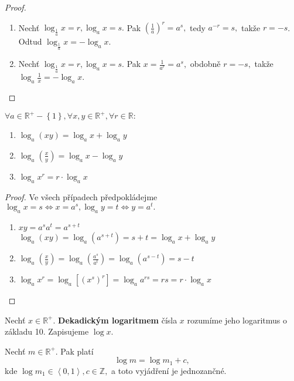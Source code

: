 \begin{proof}
    \begin{enumerate}[$i.$]
        \item Nechť $\log_{\frac{1}{a}} x = r, \log_a x = s.$ Pak
        $\left ( \frac{1}{a} \right )^r = a^s,$ tedy $a^{-r}=s,$ takže $r=-s$.
        Odtud $\log_{\frac{1}{a}} x = -\log_a x.$
       	\item Nechť $\log_{\frac{1}{a}} x = r, \log_a x = s.$ Pak
        $x = \frac{1}{a^r}=a^s,$ obdobně $r=-s,$ takže $\log_a \frac{1}{x}=
        -\log_a x.$\qedhere
    \end{enumerate}
\end{proof}

\begin{veta}
    $\forall a \in \mathbb R^+ - \left \{ 1 \right \}, \forall x,y \in \mathbb R^+
    ,\forall r \in \mathbb R:$
    \begin{enumerate}[$i.$]
        \item $\log_a (xy)=\log_a x + \log_a y$
       	\item $\log_a \left ( \frac{x}{y} \right ) = \log_a x - \log_a y $
       	\item $\log_a x^r = r\cdot \log_a x$
    \end{enumerate}
\end{veta}

\begin{proof}
    Ve všech případech předpokládejme $\log_a x = s \iff x = a^s,
    \log_a y = t \iff y = a^t.$
    \begin{enumerate}[$i.$]
        \item $xy = a^sa^t=a^{s+t}$\\
        $\log_a (xy) = \log_a (a^{s+t}) = s+t=\log_a x + \log_a y$
       	\item $\log_a \left ( \frac{x}{y} \right )  = \log_a
        \left ( \frac{a^s}{a^t} \right ) =\log_a \left ( a^{s-t} \right ) =
        s-t $
       	\item $\log_a x^r = \log_a \left [ \left ( x^s \right )^r  \right ] =
        \log_a a^{rs}=rs=r\cdot \log_a x$
    \end{enumerate}
\end{proof}

\begin{definition}
    Nechť $x\in \mathbb R^+.$ \textbf{Dekadickým logaritmem} čísla $x$ rozumíme
    jeho logaritmus o základu 10. Zapisujeme $\log x.$
\end{definition}

\begin{veta}\label{mantisa}
    Nechť $m\in \mathbb R^+.$ Pak platí
    $$\log m = \log m_1 + c,$$
    kde $\log m_1 \in \left < 0,1 \right >, c \in \mathbb Z,$ a toto vyjádření
    je jednozančné.
\end{veta}

